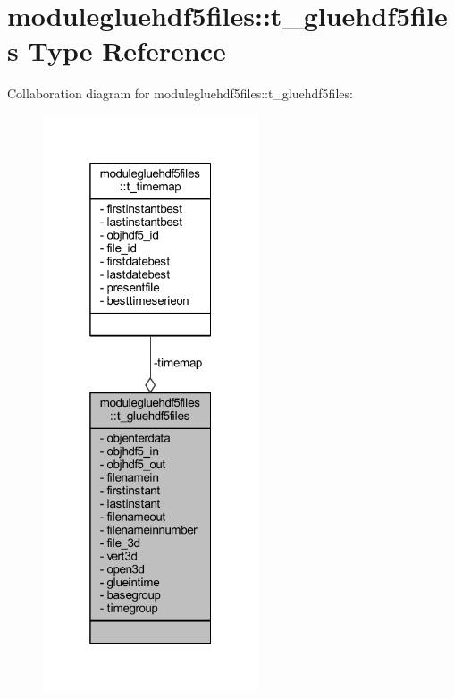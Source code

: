 \hypertarget{structmodulegluehdf5files_1_1t__gluehdf5files}{}\section{modulegluehdf5files\+:\+:t\+\_\+gluehdf5files Type Reference}
\label{structmodulegluehdf5files_1_1t__gluehdf5files}


Collaboration diagram for modulegluehdf5files\+:\+:t\+\_\+gluehdf5files\+:\nopagebreak
\begin{figure}[H]
\begin{center}
\leavevmode
\includegraphics[width=181pt]{structmodulegluehdf5files_1_1t__gluehdf5files__coll__graph}
\end{center}
\end{figure}
